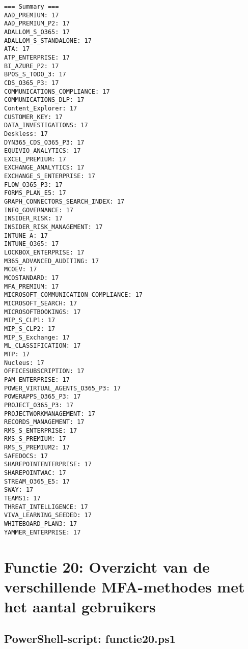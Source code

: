 \begin{tiny}
    \begin{verbatim}
=== Summary ===
AAD_PREMIUM: 17
AAD_PREMIUM_P2: 17
ADALLOM_S_O365: 17
ADALLOM_S_STANDALONE: 17
ATA: 17
ATP_ENTERPRISE: 17
BI_AZURE_P2: 17
BPOS_S_TODO_3: 17
CDS_O365_P3: 17
COMMUNICATIONS_COMPLIANCE: 17
COMMUNICATIONS_DLP: 17
Content_Explorer: 17
CUSTOMER_KEY: 17
DATA_INVESTIGATIONS: 17
Deskless: 17
DYN365_CDS_O365_P3: 17
EQUIVIO_ANALYTICS: 17
EXCEL_PREMIUM: 17
EXCHANGE_ANALYTICS: 17
EXCHANGE_S_ENTERPRISE: 17
FLOW_O365_P3: 17
FORMS_PLAN_E5: 17
GRAPH_CONNECTORS_SEARCH_INDEX: 17
INFO_GOVERNANCE: 17
INSIDER_RISK: 17
INSIDER_RISK_MANAGEMENT: 17
INTUNE_A: 17
INTUNE_O365: 17
LOCKBOX_ENTERPRISE: 17
M365_ADVANCED_AUDITING: 17
MCOEV: 17
MCOSTANDARD: 17
MFA_PREMIUM: 17
MICROSOFT_COMMUNICATION_COMPLIANCE: 17
MICROSOFT_SEARCH: 17
MICROSOFTBOOKINGS: 17
MIP_S_CLP1: 17
MIP_S_CLP2: 17
MIP_S_Exchange: 17
ML_CLASSIFICATION: 17
MTP: 17
Nucleus: 17
OFFICESUBSCRIPTION: 17
PAM_ENTERPRISE: 17
POWER_VIRTUAL_AGENTS_O365_P3: 17
POWERAPPS_O365_P3: 17
PROJECT_O365_P3: 17
PROJECTWORKMANAGEMENT: 17
RECORDS_MANAGEMENT: 17
RMS_S_ENTERPRISE: 17
RMS_S_PREMIUM: 17
RMS_S_PREMIUM2: 17
SAFEDOCS: 17
SHAREPOINTENTERPRISE: 17
SHAREPOINTWAC: 17
STREAM_O365_E5: 17
SWAY: 17
TEAMS1: 17
THREAT_INTELLIGENCE: 17
VIVA_LEARNING_SEEDED: 17
WHITEBOARD_PLAN3: 17
YAMMER_ENTERPRISE: 17
    \end{verbatim}
\end{tiny}

\clearpage

\section{Functie 20: Overzicht van de verschillende MFA-methodes met het aantal gebruikers}

\subsection{PowerShell-script: functie20.ps1}

